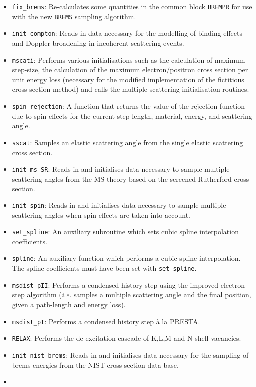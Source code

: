 \begin{itemize}
\item
{\tt fix\_brems}: Re-calculates some quantities in 
the common block {\tt BREMPR} for use with the 
new {\tt BREMS} sampling algorithm.
\item
{\tt init\_compton}: Reads in data necessary for 
the modelling of binding effects and Doppler broadening 
in incoherent scattering events.
\item
{\tt mscati}: Performs various initialisations such as 
the calculation of maximum step-size, the calculation 
of the maximum electron/positron cross section per 
unit energy loss (necessary for the modified implementation of 
the fictitious cross section method) and calls the multiple scattering 
initialisation routines.
\item
{\tt spin\_rejection}: A function that returns the 
value of the rejection function due to spin effects for the 
current step-length, material, energy, and scattering angle.
\item
{\tt sscat}: Samples an elastic scattering angle from the 
single elastic scattering cross section.
\item
{\tt init\_ms\_SR}: Reads-in and initialises data necessary to sample 
multiple scattering angles from the MS theory based on the 
screened Rutherford cross section.
\item
{\tt init\_spin}: Reads in and initialises data necessary to 
sample multiple scattering angles when spin effects are taken 
into account.
\item
{\tt set\_spline}: An auxiliary subroutine which sets cubic 
spline interpolation coefficients.
\item
{\tt spline}: An auxiliary function which performs 
a cubic spline interpolation. The spline coefficients 
must have been set with {\tt set\_spline}.
\item
{\tt msdist\_pII}: Performs a condensed history step 
using the improved electron-step algorithm ({\em i.e.} 
samples a multiple scattering angle and  the final 
position, given a path-length and energy loss).
\item
{\tt msdist\_pI}: Performs a condensed history step 
\`{a} la PRESTA.
\item
{\tt RELAX}: Performs the de-excitation cascade of K,L,M and 
N shell vacancies.
\item
{\tt init\_nist\_brems}: Reads-in and initialises data necessary 
for the sampling of brems energies from the NIST 
cross section data base.
\item

\end{itemize}

